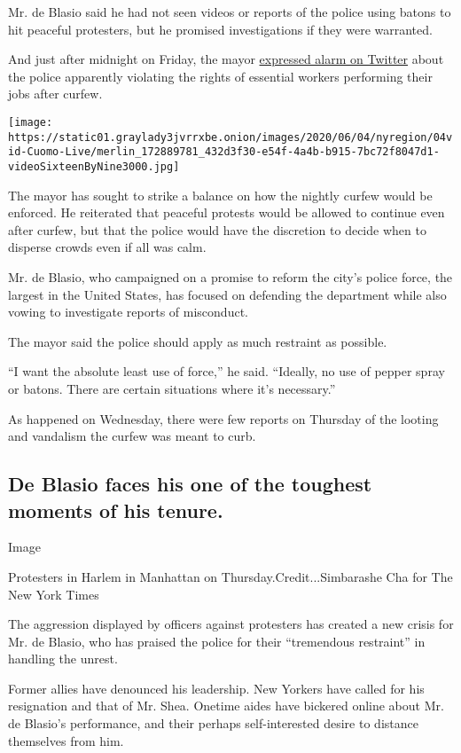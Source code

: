 Mr. de Blasio said he had not seen videos or reports of the police using
batons to hit peaceful protesters, but he promised investigations if
they were warranted.

And just after midnight on Friday, the mayor
\href{https://twitter.com/NYCMayor/status/1268756177988485121}{expressed
alarm on Twitter} about the police apparently violating the rights of
essential workers performing their jobs after curfew.

\texttt{[image: https://static01.graylady3jvrrxbe.onion/images/2020/06/04/nyregion/04vid-Cuomo-Live/merlin\_172889781\_432d3f30-e54f-4a4b-b915-7bc72f8047d1-videoSixteenByNine3000.jpg]}

The mayor has sought to strike a balance on how the nightly curfew would
be enforced. He reiterated that peaceful protests would be allowed to
continue even after curfew, but that the police would have the
discretion to decide when to disperse crowds even if all was calm.

Mr. de Blasio, who campaigned on a promise to reform the city's police
force, the largest in the United States, has focused on defending the
department while also vowing to investigate reports of misconduct.

The mayor said the police should apply as much restraint as possible.

``I want the absolute least use of force,'' he said. ``Ideally, no use
of pepper spray or batons. There are certain situations where it's
necessary.''

As happened on Wednesday, there were few reports on Thursday of the
looting and vandalism the curfew was meant to curb.

\hypertarget{de-blasio-faces-his-one-of-the-toughest-moments-of-his-tenure}{%
\subsection{De Blasio faces his one of the toughest moments of his
tenure.}\label{de-blasio-faces-his-one-of-the-toughest-moments-of-his-tenure}}

Image

Protesters in Harlem in Manhattan on Thursday.Credit...Simbarashe Cha
for The New York Times

The aggression displayed by officers against protesters has created a
new crisis for Mr. de Blasio, who has praised the police for their
``tremendous restraint'' in handling the unrest.

Former allies have denounced his leadership. New Yorkers have called for
his resignation and that of Mr. Shea. Onetime aides have bickered online
about Mr. de Blasio's performance, and their perhaps self-interested
desire to distance themselves from him.

